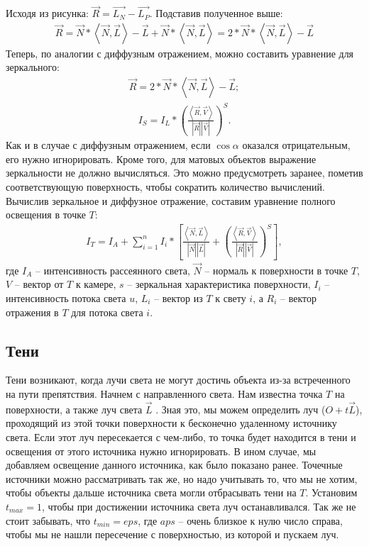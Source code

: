 Исходя из рисунка: $\vec{R} = \vec{L_{N}} -\vec{L_{P}} $. Подставив полученное выше:
\begin{gather}
	\vec{R} = \vec{N}*\left\langle{\vec{N}, \vec{L}}\right\rangle - \vec{L} + \vec{N}*\left\langle{\vec{N}, \vec{L}}\right\rangle = 2*\vec{N}*\left\langle{\vec{N}, \vec{L}}\right\rangle - \vec{L}
\end{gather}
Теперь, по аналогии с диффузным отражением, можно составить уравнение для зеркального:
\begin{gather}
	\vec{R} = 2*\vec{N}*\left\langle{\vec{N}, \vec{L}}\right\rangle - \vec{L};
\end{gather}
\begin{gather}
	I_{S} = I_{L}*\left( \frac{\left\langle{\vec{R}, \vec{V}}\right\rangle}{\left| {\vec{R}} \right| \left| {\vec{V}} \right|} \right)^{S}.
\end{gather}
Как и в случае с диффузным отражением, если $\cos{\alpha}$ оказался отрицательным, его нужно игнорировать. Кроме того, для матовых объектов выражение
зеркальности не должно вычисляться. Это можно предусмотреть заранее, пометив соответствующую поверхность, чтобы сократить количество вычислений.
Вычислив зеркальное и диффузное отражение, составим уравнение полного освещения в точке $T$:
\begin{gather}
	I_{T} = I_{A} + \sum_{i=1}^n I_{i}*\left[ {\frac{\left\langle{\vec{N}, \vec{L}}\right\rangle}{\left| {\vec{N}} \right| \left| {\vec{L}} \right|} + \left( \frac{\left\langle{\vec{R}, \vec{V}}\right\rangle}{\left| {\vec{R}} \right| \left| {\vec{V}} \right|} \right)^{S}} \right],
\end{gather}
где $I_{A}$ – интенсивность рассеянного света, $\vec{N}$ – нормаль к поверхности в
точке $T$, $V$ – вектор от $T$ к камере, $s$ – зеркальная характеристика поверхности, $I_{i}$ – интенсивность потока света $u$, $L_{i}$ – вектор из $T$ к свету $i$, а $R_{i}$ – вектор отражения в $T$ для потока света $i$.

\subsection{Тени}
Тени возникают, когда лучи света не могут достичь объекта из-за встреченного на пути препятствия.
Начнем с направленного света. Нам известна точка $T$ на поверхности, а также луч света $\vec{L}$ . Зная это, мы можем определить луч ($O+t\vec{L}$), проходящий из этой точки поверхности к бесконечно удаленному источнику света.
Если этот луч пересекается с чем-либо, то точка будет находится в тени и освещения от этого источника нужно игнорировать. В ином случае, мы добавляем освещение данного источника, как было показано ранее.
Точечные источники можно рассматривать так же, но надо учитывать то, что мы не хотим, чтобы объекты дальше источника света могли отбрасывать тени на $T$. Установим $t_{max} = 1$, чтобы при достижении источника света луч останавливался. Так же не стоит забывать, что $t_{min} = eps$, где $aps$ – очень близкое к нулю число справа, чтобы мы не нашли пересечение с поверхностью, из которой и пускаем луч.

